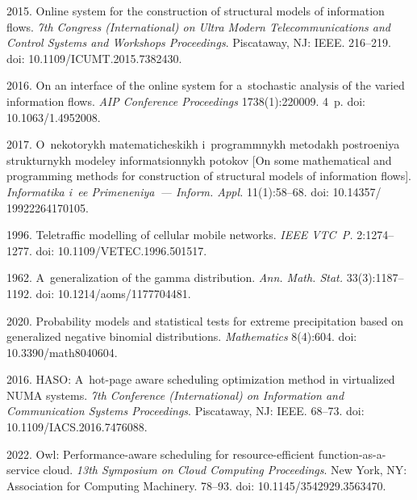 \begin{multicols}{2}
{{\begin{thebibliography}{99}
 2015. Online system for the construction of structural models of information flows. 
 \textit{7th Congress (International) on Ultra Modern Telecommunications and Control Systems and Workshops Proceedings}. 
 Piscataway, NJ: IEEE. 216--219. doi: 10.1109/ICUMT.2015.7382430.

 2016. On an interface of the online system for a~stochastic analysis of the varied information flows. 
 \textit{AIP Conference Proceedings} 1738(1):220009. 4~p. doi: 10.1063/1.4952008.

 2017. O~ne\-ko\-to\-rykh ma\-te\-ma\-ti\-che\-skikh i~prog\-ram\-mnykh me\-to\-dakh po\-stro\-eniya struk\-tur\-nykh mo\-de\-ley 
in\-for\-ma\-tsi\-on\-nykh po\-to\-kov [On some mathematical and programming methods for construction of structural models of information flows]. 
\textit{Informatika i~ee Primeneniya~--- Inform. Appl.} 11(1):58--68. doi: 10.14357/ 19922264170105.

 1996. Teletraffic modelling of cellular mobile networks. 
 \textit{IEEE VTC~P.} 2:1274--1277. doi: 10.1109/VETEC.1996.501517.

 1962. A~generalization of the gamma distribution. \textit{Ann. Math. Stat.} 33(3):1187--1192. doi: 10.1214/aoms/1177704481.

 2020. Probability models and statistical tests for extreme precipitation based on generalized negative binomial distributions. 
 \textit{Mathematics} 8(4):604. doi: 10.3390/math8040604.


 2016. HASO: A~hot-page aware scheduling optimization method in virtualized NUMA systems. 
 \textit{7th  Conference (International) on Information and Communication Systems  Proceedings}. 
 Piscataway, NJ: IEEE. 68--73. doi: 10.1109/IACS.2016.7476088.

 2022. Owl: Performance-aware scheduling for resource-efficient function-as-a-service cloud. 
 \textit{13th Symposium on Cloud Computing  Proceedings}. 
 New York, NY: Association for Computing Machinery. 78--93. 
doi: 10.1145/3542929.3563470.


\end{thebibliography}}}
\end{multicols}

